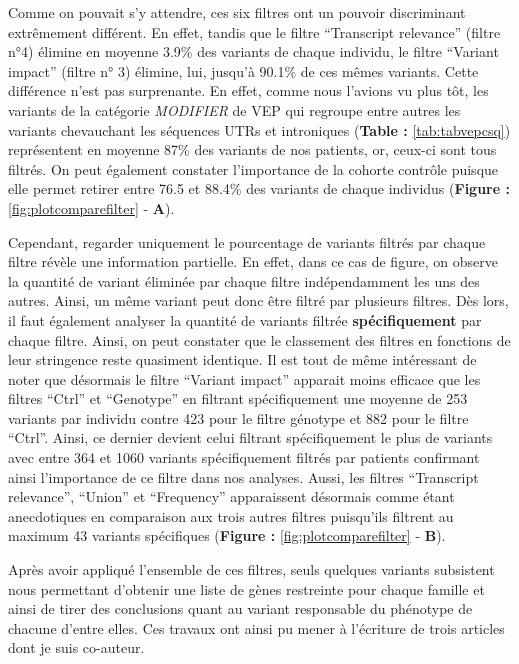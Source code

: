 \documentclass[12pt,twoside]{ugathesis}
\begin{document}
\newpage

Comme on pouvait s'y attendre, ces six filtres ont un pouvoir
discriminant extrêmement différent. En effet, tandis que le filtre
``Transcript relevance'' (filtre n°4) élimine en moyenne 3.9\% des
variants de chaque individu, le filtre ``Variant impact'' (filtre n° 3)
élimine, lui, jusqu'à 90.1\% de ces mêmes variants. Cette différence
n'est pas surprenante. En effet, comme nous l'avions vu plus tôt, les
variants de la catégorie \emph{MODIFIER} de VEP qui regroupe entre
autres les variants chevauchant les séquences UTRs et introniques
(\textbf{Table :} \ref{tab:tabvepcsq}) représentent en moyenne 87\% des
variants de nos patients, or, ceux-ci sont tous filtrés. On peut
également constater l'importance de la cohorte contrôle puisque elle
permet retirer entre 76.5 et 88.4\% des variants de chaque individus
(\textbf{Figure :} \ref{fig:plotcomparefilter} - \textbf{A}).

Cependant, regarder uniquement le pourcentage de variants filtrés par
chaque filtre révèle une information partielle. En effet, dans ce cas de
figure, on observe la quantité de variant éliminée par chaque filtre
indépendamment les uns des autres. Ainsi, un même variant peut donc être
filtré par plusieurs filtres. Dès lors, il faut également analyser la
quantité de variants filtrée \textbf{spécifiquement} par chaque filtre.
Ainsi, on peut constater que le classement des filtres en fonctions de
leur stringence reste quasiment identique. Il est tout de même
intéressant de noter que désormais le filtre ``Variant impact'' apparait
moins efficace que les filtres ``Ctrl'' et ``Genotype'' en filtrant
spécifiquement une moyenne de 253 variants par individu contre 423 pour
le filtre génotype et 882 pour le filtre ``Ctrl''. Ainsi, ce dernier
devient celui filtrant spécifiquement le plus de variants avec entre 364
et 1060 variants spécifiquement filtrés par patients confirmant ainsi
l'importance de ce filtre dans nos analyses. Aussi, les filtres
``Transcript relevance'', ``Union'' et ``Frequency'' apparaissent
désormais comme étant anecdotiques en comparaison aux trois autres
filtres puisqu'ils filtrent au maximum 43 variants spécifiques
(\textbf{Figure :} \ref{fig:plotcomparefilter} - \textbf{B}).

Après avoir appliqué l'ensemble de ces filtres, seuls quelques variants
subsistent nous permettant d'obtenir une liste de gènes restreinte pour
chaque famille et ainsi de tirer des conclusions quant au variant
responsable du phénotype de chacune d'entre elles. Ces travaux ont ainsi
pu mener à l'écriture de trois articles dont je suis co-auteur.
\end{document}
